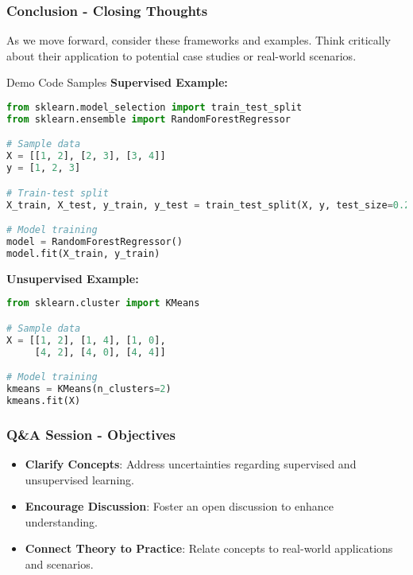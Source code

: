 \documentclass[aspectratio=169]{beamer}
\begin{document}
\begin{frame}[fragile]
    \frametitle{Conclusion - Closing Thoughts}
    As we move forward, consider these frameworks and examples. Think critically about their application to potential case studies or real-world scenarios.\\
    
    \begin{block}{Demo Code Samples}
        \textbf{Supervised Example:}
        \begin{lstlisting}[language=Python]
from sklearn.model_selection import train_test_split
from sklearn.ensemble import RandomForestRegressor

# Sample data
X = [[1, 2], [2, 3], [3, 4]]
y = [1, 2, 3]

# Train-test split
X_train, X_test, y_train, y_test = train_test_split(X, y, test_size=0.2)

# Model training
model = RandomForestRegressor()
model.fit(X_train, y_train)
        \end{lstlisting}
        
        \textbf{Unsupervised Example:}
        \begin{lstlisting}[language=Python]
from sklearn.cluster import KMeans

# Sample data
X = [[1, 2], [1, 4], [1, 0],
     [4, 2], [4, 0], [4, 4]]

# Model training
kmeans = KMeans(n_clusters=2)
kmeans.fit(X)
        \end{lstlisting}
    \end{block}
\end{frame}

\begin{frame}[fragile]
    \frametitle{Q\&A Session - Objectives}
    \begin{itemize}
        \item \textbf{Clarify Concepts}: Address uncertainties regarding supervised and unsupervised learning.
        \item \textbf{Encourage Discussion}: Foster an open discussion to enhance understanding.
        \item \textbf{Connect Theory to Practice}: Relate concepts to real-world applications and scenarios.
    \end{itemize}
\end{frame}
\end{document}
